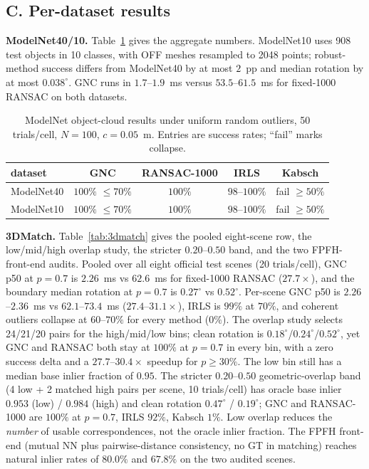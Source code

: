 \subsection*{C. Per-dataset results}
\label{app:datasets}

\noindent\textbf{ModelNet40/10.} Table~\ref{tab:modelnet} gives the aggregate numbers. ModelNet10
uses 908 test objects in 10 classes, with OFF meshes resampled to 2048 points; robust-method success
differs from ModelNet40 by at most $2$~pp and median rotation by at most $0.038^\circ$. GNC runs in
$1.7$--$1.9$~ms versus $53.5$--$61.5$~ms for fixed-1000 RANSAC on both datasets.

\begin{table}[t]
\caption{ModelNet object-cloud results under uniform random outliers, 50 trials/cell, $N=100$,
$c=0.05$~m. Entries are success rates; ``fail'' marks collapse.}
\label{tab:modelnet}
\centering
\scriptsize
\setlength{\tabcolsep}{2.5pt}
\begin{tabular}{lcccc}
\toprule
dataset & GNC & RANSAC-1000 & IRLS & Kabsch \\
\midrule
ModelNet40 & $100\%$ $\le70\%$ & $100\%$ & $98$--$100\%$ & fail $\ge50\%$ \\
ModelNet10 & $100\%$ $\le70\%$ & $100\%$ & $98$--$100\%$ & fail $\ge50\%$ \\
\bottomrule
\end{tabular}
\end{table}

\noindent\textbf{3DMatch.} Table~\ref{tab:3dmatch} gives the pooled eight-scene row, the
low/mid/high overlap study, the stricter $0.20$--$0.50$ band, and the two FPFH-front-end audits.
Pooled over all eight official test scenes (20 trials/cell), GNC p50 at $p=0.7$ is $2.26$~ms vs
$62.6$~ms for fixed-1000 RANSAC ($27.7\times$), and the boundary median rotation at $p=0.7$ is
$0.27^\circ$ vs $0.52^\circ$. Per-scene GNC p50 is $2.26$--$2.36$~ms vs $62.1$--$73.4$~ms
($27.4$--$31.1\times$), IRLS is $99\%$ at $70\%$, and coherent outliers collapse at $60$--$70\%$ for
every method ($0\%$). The overlap study selects 24/21/20 pairs for the high/mid/low bins; clean
rotation is $0.18^\circ$/$0.24^\circ$/$0.52^\circ$, yet GNC and RANSAC both stay at $100\%$ at
$p=0.7$ in every bin, with a zero success delta and a $27.7$--$30.4\times$ speedup for $p\ge30\%$.
The low bin still has a median base inlier fraction of $0.95$. The stricter $0.20$--$0.50$
geometric-overlap band (4 low + 2 matched high pairs per scene, 10 trials/cell) has oracle base
inlier $0.953$ (low) / $0.984$ (high) and clean rotation $0.47^\circ$ / $0.19^\circ$; GNC and
RANSAC-1000 are $100\%$ at $p=0.7$, IRLS $92\%$, Kabsch $1\%$. Low overlap reduces the \emph{number}
of usable correspondences, not the oracle inlier fraction. The FPFH front-end (mutual NN plus
pairwise-distance consistency, no GT in matching) reaches natural inlier rates of $80.0\%$ and
$67.8\%$ on the two audited scenes.


